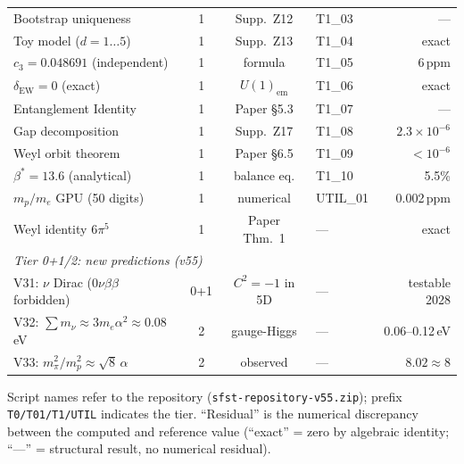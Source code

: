 \documentclass[11pt,a4paper]{article}
\begin{document}
\begin{center}
\begin{tabular}{p{3.5cm}ccp{3cm}r}
Bootstrap uniqueness & 1 & Supp.\ Z12 & T1\_03 & ---\\
Toy model ($d{=}1{\ldots}5$) & 1 & Supp.\ Z13 & T1\_04 & exact\\
$c_3{=}0.048691$ (independent) & 1 & formula & T1\_05 & 6\,ppm\\
$\delta_{\mathrm{EW}}{=}0$ (exact) & 1 & $U(1)_{\mathrm{em}}$ & T1\_06 & exact\\
Entanglement Identity & 1 & Paper \S5.3 & T1\_07 & ---\\
Gap decomposition & 1 & Supp.\ Z17 & T1\_08 & $2.3{\times}10^{-6}$\\
Weyl orbit theorem & 1 & Paper \S6.5 & T1\_09 & $<10^{-6}$\\
$\beta^*{=}13.6$ (analytical) & 1 & balance eq. & T1\_10 & 5.5\%\\
$m_p/m_e$ GPU (50 digits) & 1 & numerical & UTIL\_01 & 0.002\,ppm\\
Weyl identity $6\pi^5$ & 1 & Paper Thm.\ 1 & --- & exact\\
\midrule
\multicolumn{5}{l}{\textit{Tier 0+1/2: new predictions (v55)}}\\
\midrule
V31: $\nu$ Dirac ($0\nu\beta\beta$ forbidden) & 0{+}1 & $C^2{=}{-}1$ in 5D & --- & testable 2028\\
V32: $\sum m_\nu\approx 3m_e\alpha^2\approx 0.08\,$eV & 2 & gauge-Higgs & --- & 0.06--0.12\,eV\\
V33: $m_\pi^2/m_p^2\approx\sqrt{8}\,\alpha$ & 2 & observed & --- & $8.02\approx 8$\\
\bottomrule
\end{tabular}
\end{center}

\noindent Script names refer to the repository (\texttt{sfst-repository-v55.zip});
prefix \texttt{T0/T01/T1/UTIL} indicates the tier.
``Residual'' is the numerical discrepancy between the computed and reference value
(``exact'' = zero by algebraic identity; ``---'' = structural result, no numerical residual).

\end{document}
